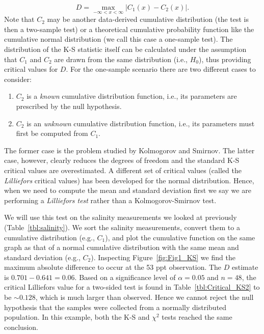 \begin{equation}
D = \max_{-\infty < x < \infty} |C_1 (x) - C_2 (x) |.
\end{equation}
Note that $C_2$ may be another data-derived cumulative distribution (the test is then a two-sample test)
or a theoretical cumulative probability function like the cumulative normal 
distribution (we call this case a one-sample test).  The distribution of the K-S statistic itself can be calculated under the assumption 
that $C_1$ and $C_2$ are drawn from the same distribution (i.e., $H_0$), thus providing critical values for $D$.  For the one-sample
scenario there are two different cases to consider:
\begin{enumerate}
	\item $C_2$ is a \emph{known} cumulative distribution function, i.e., its parameters are prescribed
	by the null hypothesis.
	\item $C_2$ is an \emph{unknown} cumulative distribution function, i.e., its parameters must first
	be computed from $C_1$.
\end{enumerate}
The former case is the problem studied by Kolmogorov and Smirnov. The latter case, however, clearly reduces the
degrees of freedom and the standard K-S critical values are overestimated.
A different set of critical values (called the \emph{Lilliefors} critical values) has been developed for the normal
distribution.  Hence, when we need to compute the mean and standard deviation first we say we are performing a
\emph{Lilliefors test} rather than a Kolmogorov-Smirnov test.

We will use this test on the salinity measurements we looked at previously (Table~\ref{tbl:salinity}).
We sort the salinity measurements, convert them to a cumulative distribution (e.g., $C_1$), and plot the cumulative function
on the same graph as that of a normal cumulative distribution with the same mean and standard deviation (e.g., $C_2$).
Inspecting Figure~\ref{fig:Fig1_KS} we find the maximum absolute 
difference to occur at the 53 ppt observation.  The $D$ estimate is $0.701 - 0.641 
= 0.06$.  Based on a significance level of $\alpha = 0.05$ and $n = 48$, the critical Lilliefors value for a two-sided test
is found in Table~\ref{tbl:Critical_KS2} to be $\sim 0.128$, which is much 
larger than observed.  Hence we cannot reject the null hypothesis that the samples were collected 
from a normally distributed population.  In this example, both the K-S and $\chi^2$ tests reached the same conclusion.

